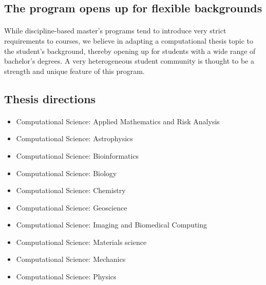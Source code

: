 \documentclass[%
oneside,                 %
final,                   %
10pt]{article}
\begin{document}
\subsection*{The program opens up for flexible backgrounds}


\paragraph{}
While discipline-based master's programs tend to introduce very strict
requirements to courses, we believe in adapting a computational thesis
topic to the student's background, thereby opening up for
students with a wide range of bachelor's degrees.
A very heterogeneous student community is thought to be a strength and
unique feature of this program.



\subsection*{Thesis directions}

\paragraph{}

\begin{itemize}
\item Computational Science: Applied Mathematics and Risk Analysis

\item Computational Science: Astrophysics

\item Computational Science: Bioinformatics

\item Computational Science: Biology

\item Computational Science: Chemistry

\item Computational Science: Geoscience

\item Computational Science: Imaging and Biomedical Computing

\item Computational Science: Materials science

\item Computational Science: Mechanics

\item Computational Science: Physics
\end{itemize}
\end{document}
